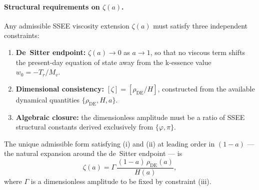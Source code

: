 \paragraph{Structural requirements on $\zeta(a)$.}
Any admissible SSEE viscosity extension $\zeta(a)$ must satisfy three
independent constraints:
\begin{enumerate}[label=(\roman*)]
  \item \textbf{De~Sitter endpoint:} $\zeta(a)\to 0$ as $a\to 1$, so that no
        viscous term shifts the present-day equation of state away from the
        k-essence value $w_0 = -T_r/M_v$.
  \item \textbf{Dimensional consistency:} $[\zeta] = [\rho_{\mathrm{DE}}/H]$,
        constructed from the available dynamical quantities
        $\{\rho_{\mathrm{DE}},H,a\}$.
  \item \textbf{Algebraic closure:} the dimensionless amplitude must be a
        ratio of SSEE structural constants derived exclusively from
        $\{\varphi,\pi\}$.
\end{enumerate}
The unique admissible form satisfying (i) and (ii) at leading order in $(1-a)$
— the natural expansion around the de~Sitter endpoint — is
%
\begin{equation}
  \zeta(a) = \Gamma\,\frac{(1-a)\,\rho_{\mathrm{DE}}(a)}{H(a)},
  \label{eq:zeta_general}
\end{equation}
%
where $\Gamma$ is a dimensionless amplitude to be fixed by constraint (iii).


